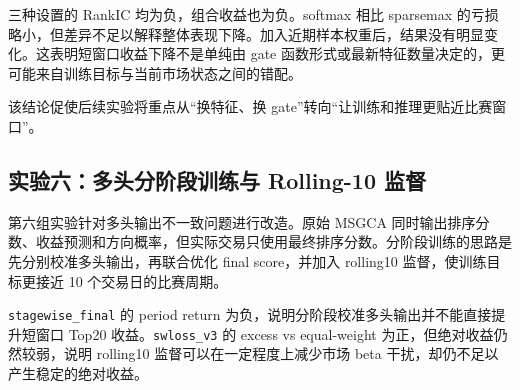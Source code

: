 \documentclass[UTF8,a4paper,12pt,fontset=none]{ctexart}
\begin{document}
\begin{table}[H]
  \centering
  \caption{最新特征复训与 Gate 函数对比}
\end{table}

三种设置的 RankIC 均为负，组合收益也为负。softmax 相比 sparsemax 的亏损略小，但差异不足以解释整体表现下降。加入近期样本权重后，结果没有明显变化。这表明短窗口收益下降不是单纯由 gate 函数形式或最新特征数量决定的，更可能来自训练目标与当前市场状态之间的错配。

该结论促使后续实验将重点从“换特征、换 gate”转向“让训练和推理更贴近比赛窗口”。

\subsection{实验六：多头分阶段训练与 Rolling-10 监督}

第六组实验针对多头输出不一致问题进行改造。原始 MSGCA 同时输出排序分数、收益预测和方向概率，但实际交易只使用最终排序分数。分阶段训练的思路是先分别校准多头输出，再联合优化 final score，并加入 rolling10 监督，使训练目标更接近 10 个交易日的比赛周期。

\begin{table}[H]
  \centering
  \caption{多头分阶段训练结果}
\end{table}

\texttt{stagewise\_final} 的 period return 为负，说明分阶段校准多头输出并不能直接提升短窗口 Top20 收益。\texttt{swloss\_v3} 的 excess vs equal-weight 为正，但绝对收益仍然较弱，说明 rolling10 监督可以在一定程度上减少市场 beta 干扰，却仍不足以产生稳定的绝对收益。
\end{document}
